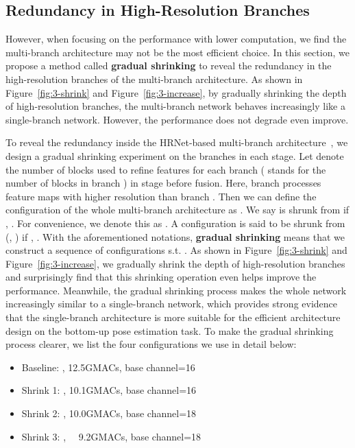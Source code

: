 \documentclass[10pt,twocolumn,letterpaper]{article}
\begin{document}
\subsection{Redundancy in High-Resolution Branches}

However, when focusing on the performance with lower computation, we find the multi-branch architecture may not be the most efficient choice. In this section, we propose a method called \textbf{gradual shrinking} to reveal the redundancy in the high-resolution branches of the multi-branch architecture. As shown in Figure~\ref{fig:3-shrink} and Figure~\ref{fig:3-increase}, by gradually shrinking the depth of high-resolution branches, the multi-branch network behaves increasingly like a single-branch network. However, the performance does not degrade even improve.

 To reveal the redundancy inside the HRNet-based multi-branch architecture~\cite{cheng2020higherhrnet,geng2021bottom}, we design a gradual shrinking experiment on the branches in each stage. Let  denote the number of blocks used to refine features for each branch ( stands for the number of blocks in branch ) in stage  before fusion. Here, branch  processes feature maps with higher resolution than branch . Then we can define the configuration of the whole multi-branch architecture as . We say  is shrunk from  if , . For convenience, we denote this as . A configuration  is said to be shrunk from  (\ie, ) if , . With the aforementioned notations, \textbf{gradual shrinking} means that we construct a sequence of configurations  s.t. . As shown in Figure~\ref{fig:3-shrink} and Figure~\ref{fig:3-increase}, we gradually shrink the depth of high-resolution branches and surprisingly find that this shrinking operation even helps improve the performance. Meanwhile, the gradual shrinking process makes the whole network increasingly similar to a single-branch network, which provides strong evidence that the single-branch architecture is more suitable for the efficient architecture design on the bottom-up pose estimation task. To make the gradual shrinking process clearer, we list the four configurations we use in detail below:

\begin{itemize}
    \item Baseline: , 12.5GMACs, base channel=16
    \item Shrink 1: , 10.1GMACs, base channel=16
    \item Shrink 2: , 10.0GMACs, base channel=18
    \item Shrink 3: , \ \ 9.2GMACs, base channel=18
\end{itemize}
\end{document}
